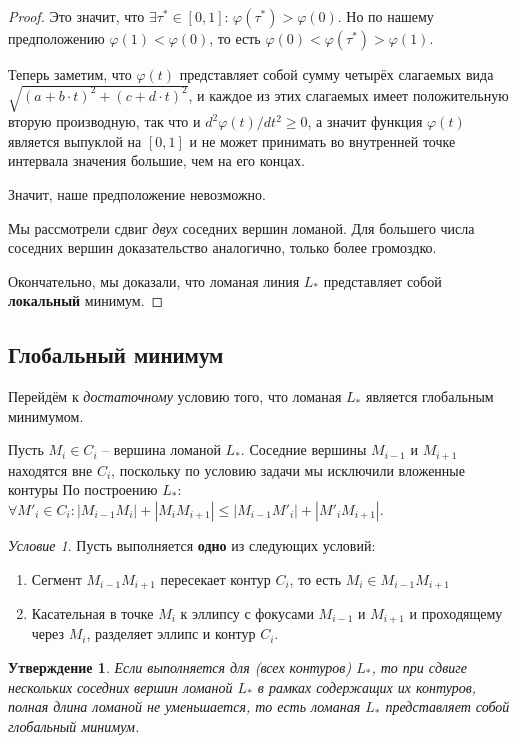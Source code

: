 \documentclass[14pt]{extarticle}
\theoremstyle{plain}%
\newtheorem{proposition}[theorem]{Утверждение}
\theoremstyle{remark}
\newtheorem{condition}{Условие}
\begin{document}
\begin{proof}
Это значит, что
$\exists \tau^* \in [0,1]$:
$\varphi(\tau^*) > \varphi(0)$.
Но по нашему предположению
$\varphi(1)<\varphi(0)$,
то есть
$\varphi(0)<\varphi(\tau^*)>\varphi(1)$.

Теперь заметим, что
$\varphi(t)$
представляет собой сумму четырёх слагаемых вида
$\sqrt{(a+b\cdot t)^2 + (c+d \cdot t)^2}$,
и каждое из этих слагаемых имеет
положительную вторую производную,
так что и
$d^2\varphi(t)/dt^2 \geqslant 0$,
а значит функция
$\varphi(t)$
является выпуклой на
$[0,1]$
и не может принимать
во внутренней точке интервала
значения большие,
чем на его концах.

Значит,
наше предположение невозможно.

Мы рассмотрели сдвиг \textit{двух}
соседних вершин ломаной.
Для большего числа соседних вершин
доказательство аналогично,
только более громоздко.

Окончательно,
мы доказали, что ломаная линия
$L_*$
представляет собой
\textbf{локальный}
минимум.
\end{proof}

\subsection{Глобальный минимум}

Перейдём к \textit{достаточному}
условию того,
что ломаная
$L_*$
является глобальным минимумом.

Пусть
$M_i \in C_i$ --
вершина ломаной
$L_*$.
Соседние вершины
$M_{i-1}$
и
$M_{i+1}$
находятся вне
$C_i$,
поскольку по условию задачи
мы исключили вложенные контуры
По построению
$L_*$:
$\forall M'_i \in C_i:
|M_{i-1} M_i|+|M_i M_{i+1}|
\leqslant
|M_{i-1} M'_i|+|M'_i M_{i+1}|
$.

\begin{condition}
Пусть выполняется
\textbf{одно}
из следующих условий:
\begin{enumerate}
  \item
  Сегмент
  $M_{i-1} M_{i+1}$
  пересекает контур
  $C_i$,
  то есть
  $M_i \in M_{i-1} M_{i+1}$
  \item
  Касательная в точке
  $M_i$
  к эллипсу с фокусами
  $M_{i-1}$
  и
  $M_{i+1}$
  и проходящему через
  $M_i$,
  разделяет эллипс и контур
  $C_i$.
\end{enumerate}
\end{condition}

\begin{proposition}
Если
выполняется для
(всех контуров)
$L_*$,
то
при сдвиге нескольких соседних вершин ломаной
$L_*$
в рамках содержащих их контуров,
полная длина ломаной не уменьшается,
то есть ломаная
$L_*$
представляет собой глобальный минимум.
\end{proposition}
\end{document}
